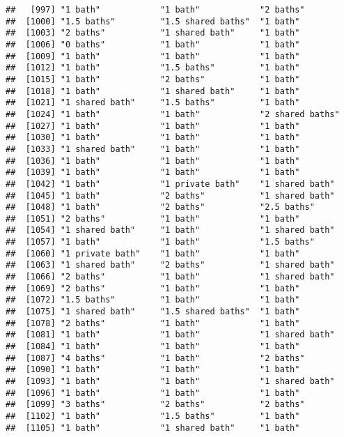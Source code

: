 \documentclass[
]{article}
\begin{document}
\begin{verbatim}
##   [997] "1 bath"            "1 bath"            "2 baths"          
##  [1000] "1.5 baths"         "1.5 shared baths"  "1 bath"           
##  [1003] "2 baths"           "1 shared bath"     "1 bath"           
##  [1006] "0 baths"           "1 bath"            "1 bath"           
##  [1009] "1 bath"            "1 bath"            "1 bath"           
##  [1012] "1 bath"            "1.5 baths"         "1 bath"           
##  [1015] "1 bath"            "2 baths"           "1 bath"           
##  [1018] "1 bath"            "1 shared bath"     "1 bath"           
##  [1021] "1 shared bath"     "1.5 baths"         "1 bath"           
##  [1024] "1 bath"            "1 bath"            "2 shared baths"   
##  [1027] "1 bath"            "1 bath"            "1 bath"           
##  [1030] "1 bath"            "1 bath"            "1 bath"           
##  [1033] "1 shared bath"     "1 bath"            "1 bath"           
##  [1036] "1 bath"            "1 bath"            "1 bath"           
##  [1039] "1 bath"            "1 bath"            "1 bath"           
##  [1042] "1 bath"            "1 private bath"    "1 shared bath"    
##  [1045] "1 bath"            "2 baths"           "1 shared bath"    
##  [1048] "1 bath"            "2 baths"           "2.5 baths"        
##  [1051] "2 baths"           "1 bath"            "1 bath"           
##  [1054] "1 shared bath"     "1 bath"            "1 shared bath"    
##  [1057] "1 bath"            "1 bath"            "1.5 baths"        
##  [1060] "1 private bath"    "1 bath"            "1 bath"           
##  [1063] "1 shared bath"     "2 baths"           "1 shared bath"    
##  [1066] "2 baths"           "1 bath"            "1 shared bath"    
##  [1069] "2 baths"           "1 bath"            "1 bath"           
##  [1072] "1.5 baths"         "1 bath"            "1 bath"           
##  [1075] "1 shared bath"     "1.5 shared baths"  "1 bath"           
##  [1078] "2 baths"           "1 bath"            "1 bath"           
##  [1081] "1 bath"            "1 bath"            "1 shared bath"    
##  [1084] "1 bath"            "1 bath"            "1 bath"           
##  [1087] "4 baths"           "1 bath"            "2 baths"          
##  [1090] "1 bath"            "1 bath"            "1 bath"           
##  [1093] "1 bath"            "1 bath"            "1 shared bath"    
##  [1096] "1 bath"            "1 bath"            "1 bath"           
##  [1099] "3 baths"           "2 baths"           "2 baths"          
##  [1102] "1 bath"            "1.5 baths"         "1 bath"           
##  [1105] "1 bath"            "1 shared bath"     "1 bath"           

\end{verbatim}
\end{document}
